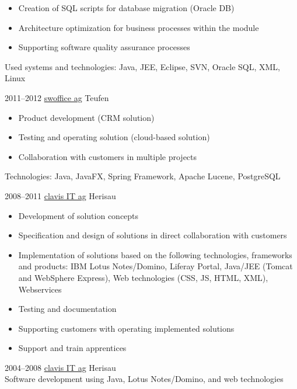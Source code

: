 \documentclass[]{cv-style}
\begin{document}
\begin{entrylist}
{\begin{itemize}
    \item Creation of SQL scripts for database migration (Oracle DB)
    \item Architecture optimization for business processes within the module
    \item Supporting software quality assurance processes
  \end{itemize}
  Used systems and technologies: Java, JEE, Eclipse, SVN, Oracle SQL, XML, Linux}
\entry
  {2011--2012}
  {\href{https://www.swoffice.ch/}{swoffice ag}}
  {Teufen}
  {
  \begin{itemize}
  	\item Product development (CRM solution)
  	\item Testing and operating solution (cloud-based solution)
  	\item Collaboration with customers in multiple projects
  \end{itemize}
  Technologies: Java, JavaFX, Spring Framework, Apache Lucene, PostgreSQL}
\entry
  {2008--2011}
  {\href{https://www.clavisit.com/}{clavis IT ag}}
  {Herisau}
  {
  \begin{itemize}
  	\item Development of solution concepts
  	\item Specification and design of solutions in direct collaboration with customers
  	\item Implementation of solutions based on the following technologies, frameworks and products: IBM Lotus Notes/Domino, Liferay Portal, Java/JEE (Tomcat and WebSphere Express), Web technologies (CSS, JS, HTML, XML), Webservices
  	\item Testing and documentation
  	\item Supporting customers with operating implemented solutions
  	\item Support and train apprentices
  \end{itemize}}
\entry
  {2004--2008}
  {\href{https://www.clavisit.com/}{clavis IT ag}}
  {Herisau}
  {\\
  Software development using Java, Lotus Notes/Domino, and web technologies}
\end{entrylist}
\end{document}
